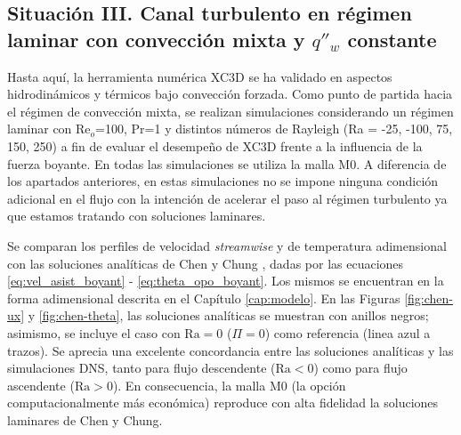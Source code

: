 \subsection{Situación III. Canal turbulento en régimen laminar con convección mixta y $q''_w$ constante} \label{sec:mix-laminar}

Hasta aquí, la herramienta numérica XC3D se ha validado en aspectos hidrodinámicos y térmicos bajo convección forzada. Como punto de partida hacia el régimen de convección mixta, se realizan simulaciones considerando un régimen laminar con Re$_o$=100, Pr=1 y distintos números de Rayleigh (Ra = -25, -100, 75, 150, 250) a fin de evaluar el desempeño de XC3D frente a la influencia de la fuerza boyante. En todas las simulaciones se utiliza la malla M0. A diferencia de los apartados anteriores, en estas simulaciones no se impone ninguna condición adicional en el flujo con la intención de acelerar el paso al régimen turbulento ya que estamos tratando con soluciones laminares.

Se comparan los perfiles de velocidad \textit{streamwise} y de temperatura adimensional con las soluciones analíticas de Chen y Chung \cite{chen1996linear}, dadas por las ecuaciones \ref{eq:vel_asist_boyant} - \ref{eq:theta_opo_boyant}. Los mismos se encuentran en la forma adimensional descrita en el Capítulo \ref{cap:modelo}. En las Figuras \ref{fig:chen-ux} y \ref{fig:chen-theta}, las soluciones analíticas se muestran con anillos negros; asimismo, se incluye el caso con $\text{Ra}=0$ ($\Pi=0$) como referencia (linea azul a trazos). Se aprecia una excelente concordancia entre las soluciones analíticas y las simulaciones DNS, tanto para flujo descendente ($\text{Ra}<0$) como para flujo ascendente ($\text{Ra}>0$). En consecuencia, la malla M0 (la opción computacionalmente más económica) reproduce con alta fidelidad la soluciones laminares de Chen y Chung. 

